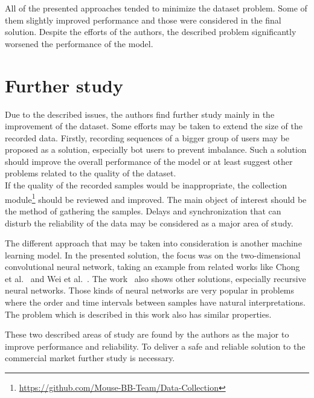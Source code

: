 All of the presented approaches tended to minimize the dataset problem.
Some of them slightly improved performance and those were considered in the final solution.
Despite the efforts of the authors, the described problem significantly worsened the performance of the model.

\section{Further study}\label{sec:further-study}
Due to the described issues, the authors find further study mainly in the improvement of the dataset.
Some efforts may be taken to extend the size of the recorded data.
Firstly, recording sequences of a bigger group of users may be proposed as a solution, especially bot users to prevent imbalance.
Such a solution should improve the overall performance of the model or at least suggest other problems related to the quality of the dataset.\\
If the quality of the recorded samples would be inappropriate, the collection module\footnote{\url{https://github.com/Mouse-BB-Team/Data-Collection}} should be reviewed and improved.
The main object of interest should be the method of gathering the samples.
Delays and synchronization that can disturb the reliability of the data may be considered as a major area of study.

The different approach that may be taken into consideration is another machine learning model.
In the presented solution, the focus was on the two-dimensional convolutional neural network, taking an example from related works like Chong et al.~\cite{Main} and Wei et al.~\cite{Inspiration}.
The work~\cite{Main} also shows other solutions, especially recursive neural networks.
Those kinds of neural networks are very popular in problems where the order and time intervals between samples have natural interpretations.
The problem which is described in this work also has similar properties.

These two described areas of study are found by the authors as the major to improve performance and reliability.
To deliver a safe and reliable solution to the commercial market further study is necessary.